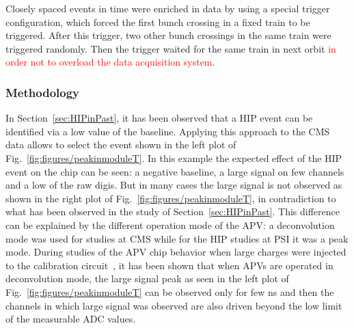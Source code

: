 Closely spaced events in time were enriched in data by using a special trigger configuration, which forced the first bunch crossing in a fixed train to be triggered. After this trigger, two other bunch crossings in the same train were triggered randomly. Then the trigger waited for the same train in next orbit \textcolor{red}{in order not to overload the data acquisition system}. 





 \subsubsection{Methodology}
 

In Section~\ref{sec:HIPinPast}, it has been observed that a HIP event can be identified via a low value of the baseline. Applying this approach to the CMS data allows to select the event shown in the left plot of Fig.~\ref{fig:figures/peakinmoduleT}. In this example the expected effect of the HIP event on the chip can be seen: a negative baseline, a large signal on few channels and a low \SD of the raw digis. But in many cases the large signal is not observed as shown in the right plot of Fig.~\ref{fig:figures/peakinmoduleT}, in contradiction to what has been observed in the study of Section~\ref{sec:HIPinPast}. This difference can be explained by the different operation mode of the APV: a deconvolution mode was used for studies at CMS while for the HIP studies at PSI it was a peak mode. During studies of the APV chip behavior when large charges were injected to the calibration circuit~\cite{Bainbridge:2002bda}, it has been shown that when APVs are operated in deconvolution mode, the large signal peak as seen in the left plot of Fig.~\ref{fig:figures/peakinmoduleT} can be observed only for few ns and then the channels in which large signal was observed are also driven beyond the low limit of the measurable ADC values. 

